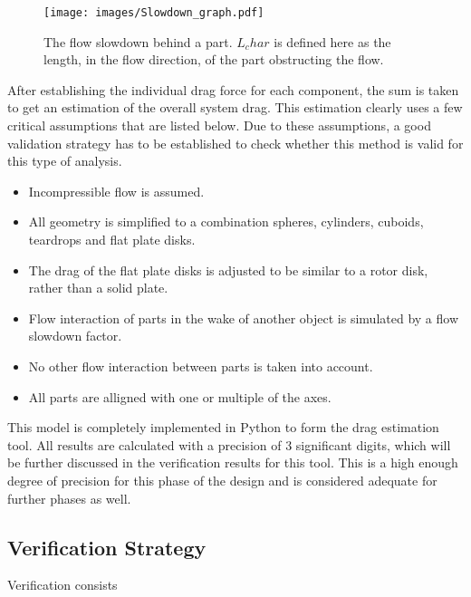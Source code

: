 \begin{figure}[H]
	\centering
	\texttt{[image: images/Slowdown\_graph.pdf]}
	\caption{The flow slowdown behind a part. $L_char$ is defined here as the length, in the flow direction, of the part obstructing the flow.}
	\label{fig:orientationdefinitiondrag}
\end{figure}

After establishing the individual drag force for each component, the sum is taken to get an estimation of the overall system drag. This estimation clearly uses a few critical assumptions that are listed below. Due to these assumptions, a good validation strategy has to be established to check whether this method is valid for this type of analysis.

\begin{itemize}
	\item Incompressible flow is assumed.
	\item All geometry is simplified to a combination spheres, cylinders, cuboids, teardrops and flat plate disks.
	\item The drag of the flat plate disks is adjusted to be similar to a rotor disk, rather than a solid plate.
	\item Flow interaction of parts in the wake of another object is simulated by a flow slowdown factor.
	\item No other flow interaction between parts is taken into account.
	\item All parts are alligned with one or multiple of the axes.
\end{itemize}

\noindent This model is completely implemented in Python to form the drag estimation tool. All results are calculated with a precision of 3 significant digits, which will be further discussed in the verification results for this tool. This is a high enough degree of precision for this phase of the design and is considered adequate for further phases as well.

\subsection{Verification Strategy}
Verification consists

